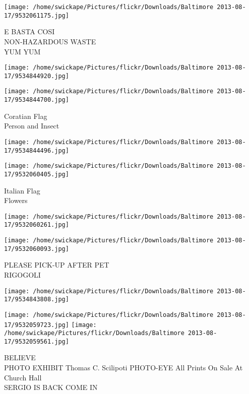 \documentclass[10pt,letterpaper]{article}
\begin{document}
\vspace{0.25in}
\texttt{[image: /home/swickape/Pictures/flickr/Downloads/Baltimore 2013-08-17/9532061175.jpg]}

E BASTA COSI\\
NON{-}HAZARDOUS WASTE\\
YUM YUM\\
\pagebreak

\texttt{[image: /home/swickape/Pictures/flickr/Downloads/Baltimore 2013-08-17/9534844920.jpg]}

\vspace{0.25in}
\texttt{[image: /home/swickape/Pictures/flickr/Downloads/Baltimore 2013-08-17/9534844700.jpg]}

Coratian Flag\\
Person and Insect\\
\pagebreak

\texttt{[image: /home/swickape/Pictures/flickr/Downloads/Baltimore 2013-08-17/9534844496.jpg]}

\vspace{0.25in}
\texttt{[image: /home/swickape/Pictures/flickr/Downloads/Baltimore 2013-08-17/9532060405.jpg]}

Italian Flag\\
Flowers\\
\pagebreak

\texttt{[image: /home/swickape/Pictures/flickr/Downloads/Baltimore 2013-08-17/9532060261.jpg]}

\vspace{0.25in}
\texttt{[image: /home/swickape/Pictures/flickr/Downloads/Baltimore 2013-08-17/9532060093.jpg]}

PLEASE PICK{-}UP AFTER PET\\
RIGOGOLI\\
\pagebreak

\texttt{[image: /home/swickape/Pictures/flickr/Downloads/Baltimore 2013-08-17/9534843808.jpg]}

\vspace{0.25in}
\texttt{[image: /home/swickape/Pictures/flickr/Downloads/Baltimore 2013-08-17/9532059723.jpg]}
\texttt{[image: /home/swickape/Pictures/flickr/Downloads/Baltimore 2013-08-17/9532059561.jpg]}

BELIEVE\\
PHOTO EXHIBIT Thomas C. Scilipoti PHOTO{-}EYE All Prints On Sale At Church Hall\\
SERGIO IS BACK COME IN\\
\pagebreak
\end{document}
